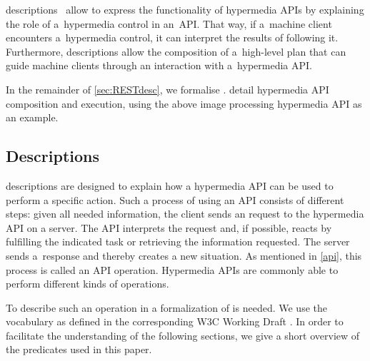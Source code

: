 \restdesc descriptions~\cite{verborgh_wsrest_2012,verborgh_mtap_2013}
allow to express the functionality of hypermedia APIs
by explaining the role of a~hypermedia control in an~API.
That way, if a~machine client encounters a~hypermedia control,
it can interpret the results of following it.
Furthermore, \restdesc descriptions allow the composition of a~high-level plan
that can guide machine clients through an interaction with a~hypermedia API.

In the remainder of \cref{sec:RESTdesc},
we formalise \restdesc.
 detail hypermedia API composition and execution,
using the above image processing hypermedia API as an example.




\subsection{\restdesc Descriptions}\label{rd}

\restdesc descriptions are designed to explain how a hypermedia API can be used to perform a specific action. 
Such a process of using an API consists of different steps:
given all needed information, the client sends an \http request to the hypermedia API on a server.
The API interprets the request and,
if possible, reacts by fulfilling the indicated task
or retrieving the information requested. The server sends a~response and thereby creates a new situation. As mentioned in \cref{api}, this process 
is called an API operation.
Hypermedia APIs are commonly able to perform different kinds of operations.

To describe such an operation in \nthree
a formalization of \http
is needed. 
We use the \rdf vocabulary as defined in the corresponding W3C Working Draft \cite{httprdf}.
In order to facilitate the understanding of the following sections, we give a short overview of the \http predicates used in this paper.

